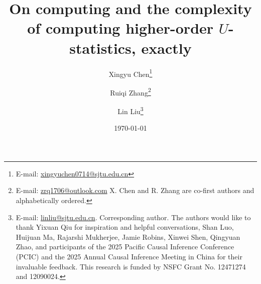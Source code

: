 \documentclass[letterpaper,11pt]{article}
\newcommand{\pdfu}{\texorpdfstring{$U$}{U}}
\begin{document}
\allowdisplaybreaks

\title{On computing and the complexity of computing higher-order \pdfu{}-statistics, exactly}

\author[1]{Xingyu Chen\thanks{E-mail: \href{chenxingyu0714@sjtu.edu.cn}{xingyuchen0714@sjtu.edu.cn}}}
\author[2]{Ruiqi Zhang\thanks{E-mail: \href{zrq1706@outlook.com}{zrq1706@outlook.com} 
X. Chen and R. Zhang are co-first authors and alphabetically ordered.}}

\author[1, 3]{Lin Liu\thanks{E-mail: \href{linliu@sjtu.edu.cn}{linliu@sjtu.edu.cn}. Corresponding author. The authors would like to thank Yixuan Qiu for inspiration and helpful conversations, Shan Luo, Huijuan Ma, Rajarshi Mukherjee, Jamie Robins, Xinwei Shen, Qingyuan Zhao, and participants of the 2025 Pacific Causal Inference Conference (PCIC) and the 2025 Annual Causal Inference Meeting in China for their invaluable feedback. This research is funded by NSFC Grant No. 12471274 and 12090024.}}
    
\date{\today}
    
\maketitle
    
\end{document}
